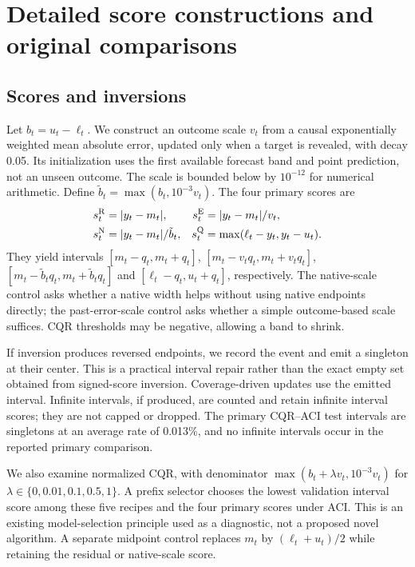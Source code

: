


\section{Detailed score constructions and original comparisons}\label{app:details}
\subsection{Scores and inversions}
Let $b_t=u_t-\ell_t$. We construct an outcome scale $v_t$ from a causal exponentially
weighted mean absolute error, updated only when a target is revealed, with decay 0.05.
Its initialization uses the first available forecast band and point prediction, not an
unseen outcome. The scale is bounded below by $10^{-12}$ for numerical arithmetic.
Define $\tilde b_t=\max(b_t,10^{-3}v_t)$. The four primary scores are
\begin{align}
 s_t^{\rm R}&=|y_t-m_t|,&
 s_t^{\rm E}&=|y_t-m_t|/v_t,\\
 s_t^{\rm N}&=|y_t-m_t|/\tilde b_t,&
 s_t^{\rm Q}&=\max(\ell_t-y_t,y_t-u_t).
\end{align}
They yield intervals $[m_t-q_t,m_t+q_t]$, $[m_t-v_tq_t,m_t+v_tq_t]$,
$[m_t-\tilde b_tq_t,m_t+\tilde b_tq_t]$ and $[\ell_t-q_t,u_t+q_t]$, respectively.
The native-scale control asks whether a native width helps without using native endpoints
directly; the past-error-scale control asks whether a simple outcome-based scale suffices.
CQR thresholds may be negative, allowing a band to shrink.

If inversion produces reversed endpoints, we record the event and emit a singleton at
their center. This is a practical interval repair rather than the exact empty set obtained
from signed-score inversion. Coverage-driven updates use the emitted interval. Infinite
intervals, if produced, are counted and retain infinite interval scores; they are not
capped or dropped. The primary CQR--ACI test intervals are singletons at an average rate
of 0.013\%, and no infinite intervals occur in the reported primary comparison.

We also examine normalized CQR, with denominator
$\max(b_t+\lambda v_t,10^{-3}v_t)$ for $\lambda\in\{0,0.01,0.1,0.5,1\}$.
A prefix selector chooses the lowest validation interval score among these five recipes
and the four primary scores under ACI. This is an existing model-selection principle used
as a diagnostic, not a proposed novel algorithm. A separate midpoint control replaces
$m_t$ by $(\ell_t+u_t)/2$ while retaining the residual or native-scale score.


